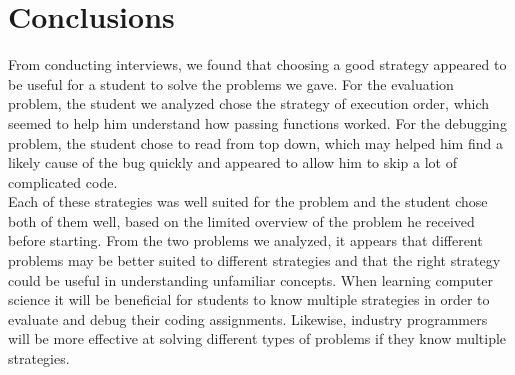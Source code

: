 \section{Conclusions}
From conducting interviews, we found that choosing a good strategy appeared to be useful for a student to solve the problems we gave. 
For the evaluation problem, the student we analyzed chose the strategy of execution order, which seemed to help him understand how passing functions worked. 
For the debugging problem, the student chose to read from top down, which may helped him find a likely cause of the bug quickly and appeared to allow him to skip a lot of complicated code.  \\

Each of these strategies was well suited for the problem and the student chose both of them well, based on the limited overview of the problem he received before starting. 
From the two problems we analyzed, it appears that different problems may be better suited to different strategies and that the right strategy could be useful in understanding unfamiliar concepts. 
When learning computer science it will be beneficial for students to know multiple strategies in order to evaluate and debug their coding assignments. Likewise, industry programmers will be more effective at solving different types of problems if they know multiple strategies. \\

